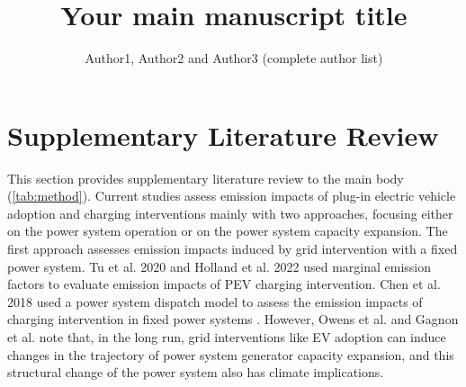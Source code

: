 \documentclass[9pt,twoside,lineno]{pnas-new}
\title{Your main manuscript title}
\author{Author1, Author2 and Author3 (complete author list)}
\begin{document}
\instructionspage  

\maketitle

\SItext

\section*{Supplementary Literature Review}

This section provides supplementary literature review to the main body (\ref{tab:method}). Current studies assess emission impacts of plug-in electric vehicle adoption and charging interventions mainly with two approaches, focusing either on the power system operation or on the power system capacity expansion. The first approach assesses emission impacts induced by grid intervention with a fixed power system\cite{holland_why_2022,tu_electric_2020,chen_emission_2022,wang_value_2021, shi_integration_2020,ryan_comparative_2016}. Tu et al. 2020 and Holland et al. 2022 used marginal emission factors to evaluate emission impacts of PEV charging intervention.\cite{tu_electric_2020,holland_why_2022} Chen et al. 2018 used a power system dispatch model to assess the emission impacts of charging intervention in fixed power systems \cite{chen_impacts_2018}. However, Owens et al. and Gagnon et al. \cite{owens_can_2022,gagnon_planning_2022} note that, in the long run, grid interventions like EV adoption can induce changes in the trajectory of power system generator capacity expansion, and this structural change of the power system also has climate implications.%
\end{document}
